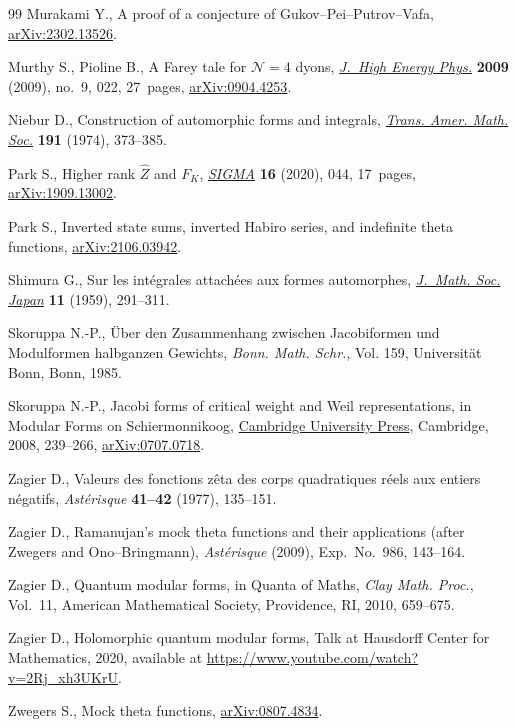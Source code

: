 \begin{thebibliography}{99}
Murakami Y., A proof of a conjecture of {G}ukov--{P}ei--{P}utrov--{V}afa,
 \href{https://arxiv.org/abs/2302.13526}{arXiv:2302.13526}.

Murthy S., Pioline B., A {F}arey tale for {${\mathcal N}=4$} dyons,
 \href{https://doi.org/10.1088/1126-6708/2009/09/022}{\textit{J.~High Energy Phys.}} \textbf{2009} (2009), no.~9, 022, 27~pages,
 \href{https://arxiv.org/abs/0904.4253}{arXiv:0904.4253}.

Niebur D., Construction of automorphic forms and integrals, \href{https://doi.org/10.2307/1997003}{\textit{Trans.
 Amer. Math. Soc.}} \textbf{191} (1974), 373--385.

Park S., Higher rank {$\hat{Z}$} and {$F_K$}, \href{https://doi.org/10.3842/SIGMA.2020.044}{\textit{SIGMA}} \textbf{16}
 (2020), 044, 17~pages, \href{https://arxiv.org/abs/1909.13002}{arXiv:1909.13002}.

Park S., Inverted state sums, inverted {H}abiro series, and indefinite theta
 functions, \href{https://arxiv.org/abs/2106.03942}{arXiv:2106.03942}.

Shimura G., Sur les int\'egrales attach\'ees aux formes automorphes,
 \href{https://doi.org/10.2969/jmsj/01140291}{\textit{J.~Math. Soc. Japan}} \textbf{11} (1959), 291--311.

Skoruppa N.-P., \"Uber den {Z}usammenhang zwischen {J}acobiformen und
 {M}odulformen halbganzen {G}ewichts, \textit{Bonn. Math. Schr.}, Vol. 159,
 Universit\"at Bonn, Bonn, 1985.

Skoruppa N.-P., Jacobi forms of critical weight and {W}eil representations, in
 Modular {F}orms on {S}chiermonnikoog, \href{https://doi.org/10.1017/CBO9780511543371.013}{Cambridge University Press}, Cambridge,
 2008, 239--266, \href{https://arxiv.org/abs/0707.0718}{arXiv:0707.0718}.

Zagier D., Valeurs des fonctions z\^eta des corps quadratiques r\'eels aux
 entiers n\'egatifs, \textit{Ast\'erisque} \textbf{41--42} (1977), 135--151.

Zagier D., Ramanujan's mock theta functions and their applications (after
 {Z}wegers and {O}no--{B}ringmann), \textit{Ast\'erisque} (2009),
 Exp.~No.~986, 143--164.

Zagier D., Quantum modular forms, in Quanta of {M}aths, \textit{Clay Math.
 Proc.}, Vol.~11, American Mathematical Society, Providence, RI, 2010,
 659--675.

Zagier D., Holomorphic quantum modular forms,
{T}alk at {H}ausdorff {C}enter for {M}athematics, 2020, available at \url{https://www.youtube.com/watch?v=2Rj_xh3UKrU}.

Zwegers S., Mock theta functions, \href{https://arxiv.org/abs/0807.4834}{arXiv:0807.4834}.

\end{thebibliography}
